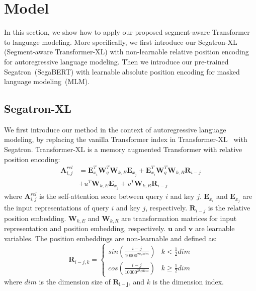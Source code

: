 \documentclass[letterpaper]{article}
\begin{document}
 \section{Model}
In this section, we show how to apply our proposed segment-aware Transformer to language modeling. More specifically, we first introduce our Segatron-XL (Segment-aware Transformer-XL) with non-learnable relative position encoding for autoregressive language modeling. 
Then we introduce our pre-trained Segatron~(SegaBERT) with learnable absolute position encoding for masked language modeling~(MLM).

\subsection{Segatron-XL}
We first introduce our method in the context of autoregressive language modeling, by replacing the vanilla Transformer index in  Transformer-XL~\citep{DBLP:conf/acl/DaiYYCLS19} with Segatron.
Transformer-XL is a memory augmented Transformer with relative position encoding: 
\begin{equation}\label{equ:attn_tranxl}
  \begin{array}{ll}
    \mathbf{A}_{i,j}^{rel}&= \mathbf{E}_{x_i}^T\mathbf{W}_q^T\mathbf{W}_{k,E}\mathbf{E}_{x_j} + \mathbf{E}_{x_i}^T\mathbf{W}_q^T\mathbf{W}_{k,R}\mathbf{R}_{i-j} \\
    & +  u^T\mathbf{W}_{k,E}\mathbf{E}_{x_j} +  v^T\mathbf{W}_{k,R}\mathbf{R}_{i-j}
  \end{array}
\end{equation} 
where $\mathbf{A}_{i,j}^{rel}$ is the self-attention score between query $i$ and key $j$. 
$\mathbf{E}_{x_i}$ and $\mathbf{E}_{x_j}$ are the input representations of query $i$ and key $j$, respectively. 
$\mathbf{R}_{i-j}$ is the relative position embedding. 
$\mathbf{W}_{k,E}$ and $\mathbf{W}_{k,R}$ are transformation matrices for input representation and position embedding, respectively. 
$\mathbf{u}$ and  $\mathbf{v}$ are learnable variables.
The position embeddings are non-learnable and defined as:
\begin{equation}\label{equ:pos_tranxl}
  \mathbf{R}_{i-j,k} = \left\{
  \begin{array}{ll}
    sin(\frac{i-j}{10000^{2k/dim}})  & k<\frac{1}{2}dim \\
    cos(\frac{i-j}{10000^{2k/dim}})  &  k \geq \frac{1}{2}dim
  \end{array}
\right.
\end{equation} 
where $dim$ is the dimension size of $\mathbf{\mathbf{R}_{i-j}}$, and $k$ is the dimension index. 
\end{document}
